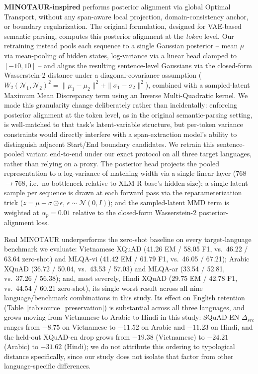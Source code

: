 \documentclass[11pt]{article}
\begin{document}
\textbf{MINOTAUR-inspired}
\label{sec:appendix_minotaur}
\citep{sherborne-etal-2023-optimal} performs posterior alignment via global Optimal Transport, without any span-aware local projection, domain-consistency anchor, or boundary regularization. The original formulation, designed for VAE-based semantic parsing, computes this posterior alignment at the \emph{token} level. Our retraining instead pools each sequence to a single Gaussian posterior -- mean $\mu$ via mean-pooling of hidden states, log-variance via a linear head clamped to $[-10, 10]$ -- and aligns the resulting sentence-level Gaussians via the closed-form Wasserstein-2 distance under a diagonal-covariance assumption ($W_2(\mathcal{N}_1,\mathcal{N}_2)^2 = \|\mu_1-\mu_2\|^2 + \|\sigma_1-\sigma_2\|^2$), combined with a sampled-latent Maximum Mean Discrepancy term using an Inverse Multi-Quadratic kernel. We made this granularity change deliberately rather than incidentally: enforcing posterior alignment at the token level, as in the original semantic-parsing setting, is well-matched to that task's latent-variable structure, but per-token variance constraints would directly interfere with a span-extraction model's ability to distinguish adjacent Start/End boundary candidates. We retrain this sentence-pooled variant end-to-end under our exact protocol on all three target languages, rather than relying on a proxy. The posterior head projects the pooled representation to a log-variance of matching width via a single linear layer (768$\to$768, i.e.\ no bottleneck relative to XLM-R-base's hidden size); a single latent sample per sequence is drawn at each forward pass via the reparameterization trick ($z=\mu+\sigma\odot\epsilon$, $\epsilon\sim\mathcal{N}(0,I)$); and the sampled-latent MMD term is weighted at $\alpha_p=0.01$ relative to the closed-form Wasserstein-2 posterior-alignment loss.

Real MINOTAUR underperforms the zero-shot baseline on every target-language benchmark we evaluate: Vietnamese XQuAD (41.26 EM / 58.05 F1, vs.\ 46.22 / 63.64 zero-shot) and MLQA-vi (41.42 EM / 61.79 F1, vs.\ 46.05 / 67.21); Arabic XQuAD (36.72 / 50.04, vs.\ 43.53 / 57.03) and MLQA-ar (33.54 / 52.81, vs.\ 37.26 / 56.38); and, most severely, Hindi XQuAD (29.75 EM / 42.78 F1, vs.\ 44.54 / 60.21 zero-shot), its single worst result across all nine language/benchmark combinations in this study. Its effect on English retention (Table~\ref{tab:source_preservation}) is substantial across all three languages, and grows moving from Vietnamese to Arabic to Hindi in this study: SQuAD-EN $\Delta_{src}$ ranges from $-8.75$ on Vietnamese to $-11.52$ on Arabic and $-11.23$ on Hindi, and the held-out XQuAD-en drop grows from $-19.38$ (Vietnamese) to $-24.21$ (Arabic) to $-31.62$ (Hindi); we do not attribute this ordering to typological distance specifically, since our study does not isolate that factor from other language-specific differences.
\end{document}
